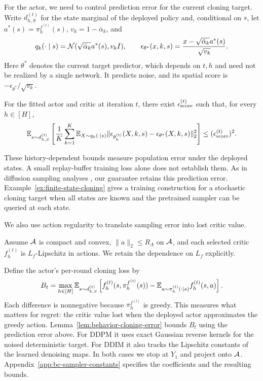 For the actor, we need to control prediction error for the current cloning target. Write $d_{h,S}^{(t)}$ for the state marginal of the deployed policy and, conditional on $s$, let $a^*(s)=\pi_h^{f^{(t)}}(s)$, $v_k=1-\bar\alpha_k$, and
\[
 q_k(\cdot\mid s)={\mathcal{N}}(\sqrt{\bar\alpha_k}a^*(s),v_kI),\qquad
 \epsilon_{\theta^*}(x,k,s)=\frac{x-\sqrt{\bar\alpha_k}a^*(s)}{\sqrt{v_k}}.
\]
Here $\theta^*$ denotes the current target predictor, which depends on $t,h$ and need not be realized by a single network. It predicts noise, and its spatial score is $-\epsilon_{\theta^*}/\sqrt{v_k}$.
\begin{aspt}\label{aspt:score-matching-error}
For the fitted actor and critic at iteration $t$, there exist $\epsilon_{\text{score}}^{(t)}$ such that, for every $h\in[H]$,
\[
 \mathbb{E}_{s\sim d_{h,S}^{(t)}}\left[\frac1K\sum_{k=1}^K\mathbb{E}_{X\sim q_k(\cdot\mid s)}
 \|\epsilon_{\theta_h^{(t)}}(X,k,s)-\epsilon_{\theta^*}(X,k,s)\|_2^2\right]\le (\epsilon_{\text{score}}^{(t)})^2.
\]
\end{aspt}
These history-dependent bounds measure population error under the deployed states. A small replay-buffer training loss alone does not establish them. As in diffusion sampling analyses \citep{li2024sharpconvergencetheoryprobability, li2025odtconvergencetheorydiffusion}, our guarantee retains this prediction error. Example~\ref{ex:finite-state-cloning} gives a training construction for a stochastic cloning target when all states are known and the pretrained sampler can be queried at each state.

We also use action regularity to translate sampling error into lost critic value.
\begin{aspt}\label{ass:a-bounded}
    Assume ${\mathcal{A}}$ is compact and convex, $\|a\|_2\le R_A$ on ${\mathcal{A}}$, and each selected critic $f_h^{(t)}$ is $L_f$-Lipschitz in actions. We retain the dependence on $L_f$ explicitly.
\end{aspt}
Define the actor's per-round cloning loss by
\begin{equation}\label{eq:bc-greediness-loss}
 B_t=\max_{h\in[H]}\mathbb{E}_{s\sim d_{h,S}^{(t)}}
 \left[f_h^{(t)}(s,\pi_h^{f^{(t)}}(s))
       -\mathbb{E}_{a\sim\pi_h^{(t)}(\cdot\mid s)}f_h^{(t)}(s,a)\right].
\end{equation}
Each difference is nonnegative because $\pi_h^{f^{(t)}}$ is greedy. This measures what matters for regret: the critic value lost when the deployed actor approximates the greedy action. Lemma~\ref{lem:behavior-cloning-error} bounds $B_t$ using the prediction error above. For DDPM it uses exact Gaussian reverse kernels for the noised deterministic target. For DDIM it also tracks the Lipschitz constants of the learned denoising maps. In both cases we stop at $Y_1$ and project onto ${\mathcal{A}}$. Appendix~\ref{app:bc-sampler-constants} specifies the coefficients and the resulting bounds.

